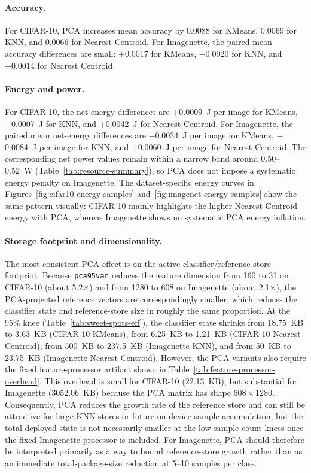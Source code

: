 \documentclass[sigconf,review,nonacm]{acmart}
\begin{document}
\paragraph{Accuracy.}
For CIFAR-10, PCA increases mean accuracy by 0.0088 for KMeans, 0.0069 for KNN, and 0.0066 for Nearest Centroid.
For Imagenette, the paired mean accuracy differences are small: +0.0017 for KMeans, $-$0.0020 for KNN, and +0.0014 for Nearest Centroid.

\paragraph{Energy and power.}
For CIFAR-10, the net-energy differences are +0.0009~J per image for KMeans, $-$0.0007~J for KNN, and +0.0042~J for Nearest Centroid.
For Imagenette, the paired mean net-energy differences are $-$0.0034~J per image for KMeans, $-$0.0084~J per image for KNN, and +0.0060~J per image for Nearest Centroid. The corresponding net power values remain within a narrow band around 0.50--0.52~W (Table~\ref{tab:resource-summary}), so PCA does not impose a systematic energy penalty on Imagenette.
The dataset-specific energy curves in Figures~\ref{fig:cifar10-energy-samples} and~\ref{fig:imagenet-energy-samples} show the same pattern visually: CIFAR-10 mainly highlights the higher Nearest Centroid energy with PCA, whereas Imagenette shows no systematic PCA energy inflation.

\paragraph{Storage footprint and dimensionality.}
The most consistent PCA effect is on the active classifier/reference-store footprint.
Because \texttt{pca95var} reduces the feature dimension from 160 to 31 on CIFAR-10 (about 5.2$\times$) and from 1280 to 608 on Imagenette (about 2.1$\times$), the PCA-projected reference vectors are correspondingly smaller, which reduces the classifier state and reference-store size in roughly the same proportion.
At the 95\% knee (Table~\ref{tab:sweet-spots-eff}), the classifier state shrinks from 18.75~KB to 3.63~KB (CIFAR-10 KMeans), from 6.25~KB to 1.21~KB (CIFAR-10 Nearest Centroid), from 500~KB to 237.5~KB (Imagenette KNN), and from 50~KB to 23.75~KB (Imagenette Nearest Centroid).
However, the PCA variants also require the fixed feature-processor artifact shown in Table~\ref{tab:feature-processor-overhead}.
This overhead is small for CIFAR-10 (22.13~KB), but substantial for Imagenette (3052.06~KB) because the PCA matrix has shape $608\times1280$.
Consequently, PCA reduces the growth rate of the reference store and can still be attractive for large KNN stores or future on-device sample accumulation, but the total deployed state is not necessarily smaller at the low sample-count knees once the fixed Imagenette processor is included.
For Imagenette, PCA should therefore be interpreted primarily as a way to bound reference-store growth rather than as an immediate total-package-size reduction at 5--10 samples per class.
\end{document}

